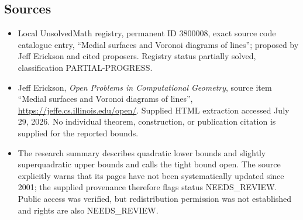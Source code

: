 \documentclass[11pt]{article}
\begin{document}
\subsection{Sources}
\begin{itemize}
\item Local UnsolvedMath registry, permanent ID 3800008, exact source code catalogue entry, ``Medial surfaces and Voronoi diagrams of lines''; proposed by Jeff Erickson and cited proposers. Registry status partially solved, classification PARTIAL-PROGRESS.
\item Jeff Erickson, \emph{Open Problems in Computational Geometry}, source item ``Medial surfaces and Voronoi diagrams of lines'', \url{https://jeffe.cs.illinois.edu/open/}. Supplied HTML extraction accessed July 29, 2026. No individual theorem, construction, or publication citation is supplied for the reported bounds.
\item The research summary describes quadratic lower bounds and slightly superquadratic upper bounds and calls the tight bound open. The source explicitly warns that its pages have not been systematically updated since 2001; the supplied provenance therefore flags status NEEDS\_REVIEW. Public access was verified, but redistribution permission was not established and rights are also NEEDS\_REVIEW.
\end{itemize}
\end{document}
